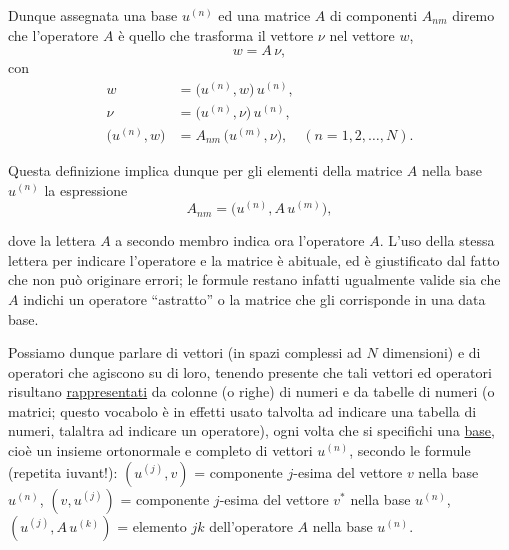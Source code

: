 \documentclass[11pt, a4paper]{book}
\numberwithin{equation}{section}
\begin{document}
Dunque assegnata una base $u^{(n)}$ ed una matrice $A$ di componenti
$A_{nm}$ diremo che l'operatore $A$ è quello che trasforma il vettore $\nu$
nel vettore $w$,
\begin{equation}
w = A\,\nu,
\end{equation}
con
\begin{align}
w &= \bigl(u^{(n)}, w\bigr)\,u^{(n)}, \tag{6} \\
\nu &= \bigl(u^{(n)}, \nu\bigr)\,u^{(n)}, \tag{7} \\
\bigl(u^{(n)}, w\bigr) &= A_{nm}\,\bigl(u^{(m)}, \nu\bigr),
  \quad (n = 1,2,\ldots,N). \tag{8}
\end{align}

Questa definizione implica dunque per gli elementi della matrice $A$ nella
base $u^{(n)}$ la espressione
\begin{equation}
A_{nm} = \bigl(u^{(n)}, A\,u^{(m)}\bigr),
\end{equation}


dove la lettera $A$ a secondo membro indica ora l'operatore $A$. L'uso
della stessa lettera per indicare l'operatore e la matrice è abituale, ed è
giustificato dal fatto che non può originare errori; le formule restano
infatti ugualmente valide sia che $A$ indichi un operatore ``astratto'' o
la matrice che gli corrisponde in una data base.

Possiamo dunque parlare di vettori (in spazi complessi ad $N$ dimensioni)
e di operatori che agiscono su di loro, tenendo presente che tali vettori
ed operatori risultano \uline{rappresentati} da colonne (o righe) di
numeri e da tabelle di numeri (o matrici; questo vocabolo è in effetti usato
talvolta ad indicare una tabella di numeri, talaltra ad indicare un
operatore), ogni volta che si specifichi una \uline{base}, cioè un
insieme ortonormale e completo di vettori $u^{(n)}$, secondo le formule
(repetita iuvant!): $(u^{(j)},v)$ = componente $j$-esima del vettore $v$
nella base $u^{(n)}$, $(v, u^{(j)})$ = componente $j$-esima del vettore
$v^*$ nella base $u^{(n)}$, $(u^{(j)}, A\,u^{(k)})$ = elemento $jk$
dell'operatore $A$ nella base $u^{(n)}$.
\end{document}
